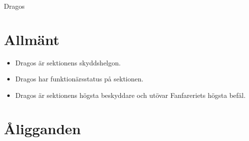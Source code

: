 \documentclass[a4paper]{article}
\begin{document}
\renewcommand{\forening}{Dragos} %

\begin{foreningenv}{\forening{}} %
    \section{Allmänt}
    \begin{itemize}
        \item Dragos är sektionens skyddshelgon.
        \item Dragos har funktionärsstatus på sektionen.
        \item Dragos är sektionens högsta beskyddare och utövar Fanfareriets högsta befäl.
    \end{itemize}
    
    \section{Åligganden}
    \aliggsektfunkt{} %
\end{foreningenv}
\end{document}

